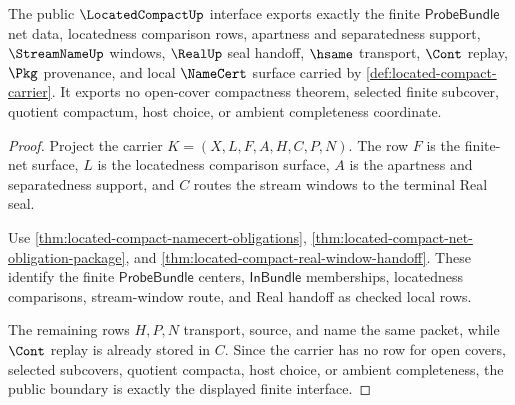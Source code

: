 \begin{theorem}
\label{thm:located-compact-public-finite-net-boundary}
The public $\LocatedCompactUp$ interface exports exactly the finite $\mathsf{ProbeBundle}$ net data, locatedness comparison rows, apartness and separatedness support, $\StreamNameUp$ windows, $\RealUp$ seal handoff, $\hsame$ transport, $\Cont$ replay, $\Pkg$ provenance, and local $\NameCert$ surface carried by \autoref{def:located-compact-carrier}. It exports no open-cover compactness theorem, selected finite subcover, quotient compactum, host choice, or ambient completeness coordinate.
\end{theorem}
\begin{proof}
Project the carrier $K=(X,L,F,A,H,C,P,N)$. The row $F$ is the finite-net surface, $L$ is the locatedness comparison surface, $A$ is the apartness and separatedness support, and $C$ routes the stream windows to the terminal Real seal.

Use \autoref{thm:located-compact-namecert-obligations}, \autoref{thm:located-compact-net-obligation-package}, and \autoref{thm:located-compact-real-window-handoff}. These identify the finite $\mathsf{ProbeBundle}$ centers, $\mathsf{InBundle}$ memberships, locatedness comparisons, stream-window route, and Real handoff as checked local rows.

The remaining rows $H,P,N$ transport, source, and name the same packet, while $\Cont$ replay is already stored in $C$. Since the carrier has no row for open covers, selected subcovers, quotient compacta, host choice, or ambient completeness, the public boundary is exactly the displayed finite interface.
\end{proof}

